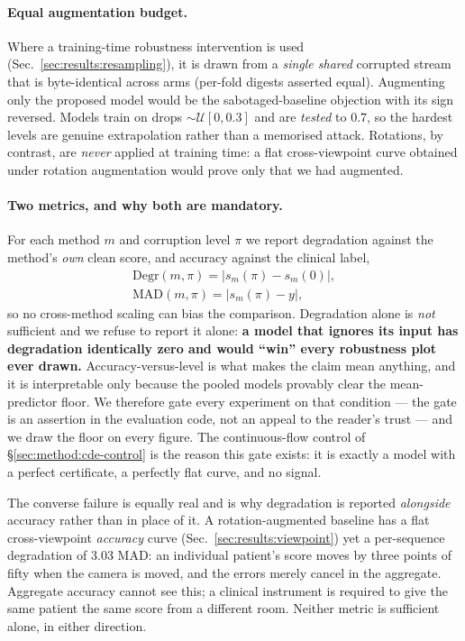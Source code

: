 \documentclass[10pt,journal]{IEEEtran}
\begin{document}
\paragraph{Equal augmentation budget.}
Where a training-time robustness intervention is used (Sec.~\ref{sec:results:resampling}), it is drawn
from a \emph{single shared} corrupted stream that is byte-identical across arms (per-fold digests
asserted equal). Augmenting only the proposed model would be the sabotaged-baseline objection with
its sign reversed. Models train on drops $\sim\mathcal{U}[0,0.3]$ and are \emph{tested} to $0.7$, so
the hardest levels are genuine extrapolation rather than a memorised attack. Rotations, by contrast,
are \emph{never} applied at training time: a flat cross-viewpoint curve obtained under rotation
augmentation would prove only that we had augmented.

\paragraph{Two metrics, and why both are mandatory.}
For each method $m$ and corruption level $\pi$ we report degradation against the method's \emph{own}
clean score, and accuracy against the clinical label,
%
\begin{equation}
\label{eq:metrics}
\begin{gathered}
\mathrm{Degr}(m,\pi)=\big|s_m(\pi)-s_m(0)\big|,\\[2pt]
\mathrm{MAD}(m,\pi)=\big|s_m(\pi)-y\big| ,
\end{gathered}
\end{equation}
%
so no cross-method scaling can bias the comparison. Degradation alone is \emph{not} sufficient and we
refuse to report it alone: \textbf{a model that ignores its input has degradation identically zero and
would ``win'' every robustness plot ever drawn.} Accuracy-versus-level is what makes the claim mean
anything, and it is interpretable only because the pooled models provably clear the mean-predictor
floor. We therefore gate every experiment on that condition --- the gate is an assertion in the
evaluation code, not an appeal to the reader's trust --- and we draw the floor on every figure. The
continuous-flow control of \S\ref{sec:method:cde-control} is the reason this gate exists: it is exactly
a model with a perfect certificate, a perfectly flat curve, and no signal.

The converse failure is equally real and is why degradation is reported \emph{alongside} accuracy
rather than in place of it. A rotation-augmented baseline has a flat cross-viewpoint \emph{accuracy}
curve (Sec.~\ref{sec:results:viewpoint}) yet a per-sequence degradation of $3.03$ MAD: an individual
patient's score moves by three points of fifty when the camera is moved, and the errors merely cancel
in the aggregate. Aggregate accuracy cannot see this; a clinical instrument is required to give the
same patient the same score from a different room. Neither metric is sufficient alone, in either
direction.
\end{document}

